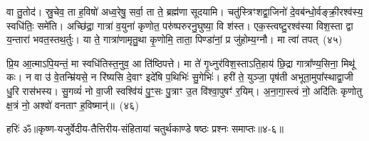वा तु॒तोद॑। स्रु॒चेव॒ ता ह॒विषो॑ अध्व॒रेषु॒ सर्वा॒ ता ते॒ ब्रह्म॑णा सूदयामि। चतु॑स्त्रिꣳशद्वा॒जिनो॑ दे॒वब॑न्धो॒र्वङ्क्री॒रश्व॑स्य॒ स्वधि॑तिः॒ समे॑ति। अच्छि॑द्रा॒ गात्रा॑ व॒युना॑ कृणोत॒ परु॑ष्परुरनु॒घुष्या॒ वि श॑स्त। एक॒स्त्वष्टु॒रश्व॑स्या विश॒स्ता द्वा य॒न्तारा॑ भवत॒स्तथ॒र्तुः। या ते॒ गात्रा॑णामृतु॒था कृ॒णोमि॒ ताता॒ पिण्डा॑नां॒ प्र जु॑होम्य॒ग्नौ। मा त्वा॑ तपत्~(४५)\ip

प्रि॒य आ॒त्मा\-ऽ\-पि॒यन्तं॒ मा स्वधि॑तिस्त॒नुव॒ आ ति॑ष्ठिपत्ते। मा ते॑ गृ॒ध्नुर॑विश॒स्ताऽति॒हाय॑ छि॒द्रा गात्रा᳚ण्य॒सिना॒ मिथू॑ कः। न वा उ॑ वे॒तन्म्रि॑यसे॒ न रि॑ष्यसि दे॒वाꣳ इदे॑षि प॒थिभिः॑ सु॒गेभिः॑। हरी॑ ते॒ युञ्जा॒ पृष॑ती अभूता॒मुपा᳚स्थाद्वा॒जी धु॒रि रास॑भस्य। सु॒गव्यं॑ नो वा॒जी स्वश्वि॑यं पु॒ꣳ॒सः पु॒त्राꣳ उ॒त वि॑श्वा॒पुषꣳ॑ र॒यिम्। अ॒ना॒गा॒स्त्वं नो॒ अदि॑तिः कृणोतु क्ष॒त्रं नो॒ अश्वो॑ वनताꣳ ह॒विष्मान्॑॥~(४६)\ip


{\anuvakamend[{घा॒सिं कश॑या तपद्र॒यिं नव॑ च}]}

{हरिः॑ ॐ}{॥कृष्ण-यजुर्वेदीय-तैत्तिरीय-संहितायां चतुर्थकाण्डे षष्ठः प्रश्नः समाप्तः॥४-६॥}


